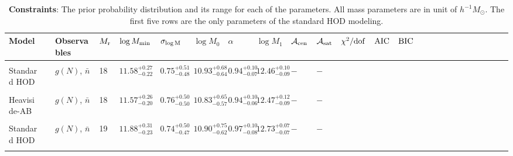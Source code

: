 \documentclass[12pt, preprint]{emulateapj}
\newcommand{\gmf}{g(N)}
\newcommand{\mr}{M_{\rm r}}
\newcommand{\mzero}{\log M_{0}}
\newcommand{\mone}{\log M_{1}}
\newcommand{\mmin}{\log M_{\rm min}}
\newcommand{\sigmam}{\sigma_{\log \rm M}}
\newcommand{\acen}{\mathcal{A}_{\rm cen}}
\newcommand{\asat}{\mathcal{A}_{\rm sat}}
\begin{document}
\begin{table*}
\begin{center}
  \label{tab:prior}
  \caption{{\bf Constraints}: The prior probability distribution 
  and its range for each of the parameters. 
  All mass parameters are in unit of $h^{-1}M_\odot$. The first five rows are the only parameters of the standard HOD modeling.}
\begin{tabular}{@{}lllllllllllllllllllllllll}
\\ \hline 
    Model & & Observables & $\mr$ & $\mmin$ & $\sigmam$ & $\mzero$ & $\alpha$ &  $\mone$ & $\acen$ & $\asat$ & $\chi^{2}/\rm{dof}$ & $\rm{AIC}$ & $\rm{BIC}$\\  \hline
  \\
  Standard HOD & & $\gmf$, $\bar{n}$ & 18 & $11.58^{+0.27}_{-0.22}$ &  $0.75^{+0.51}_{-0.48}$ & $10.93^{+0.68}_{-0.64}$ & $0.94^{+0.10}_{-0.07}$ &  $12.46^{+0.10}_{-0.09}$ & $-$ & $-$ \\ \\
   Heaviside-AB & & $\gmf$, $\bar{n}$ & 18 & $11.57^{+0.26}_{-0.20}$ &  $0.76^{+0.50}_{-0.50}$ & $10.83^{+0.65}_{-0.57}$ & $0.94^{+0.10}_{-0.06}$ &  $12.47^{+0.12}_{-0.09}$ & $-$ & $-$ \\ \\
   
Standard HOD & & $\gmf$, $\bar{n}$ & 19 & $11.88^{+0.31}_{-0.23}$ &  $0.74^{+0.50}_{-0.47}$ & $10.90^{+0.75}_{-0.62}$ & $0.97^{+0.10}_{-0.08}$ &  $12.73^{+0.07}_{-0.07}$ & $-$ & $-$ \\ \\
    

\end{tabular}
\end{center}
\end{table*}
\end{document}
